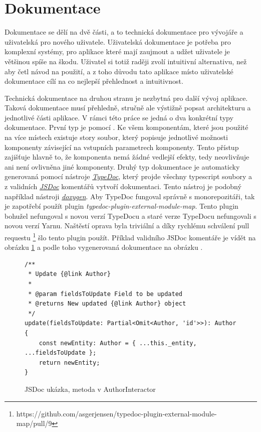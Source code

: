 \section{Dokumentace}
\label{sc:documentation}
Dokumentace se dělí na dvě části, a to technická dokumentace pro vývojáře a uživatelská pro nového uživatele. Uživatelská dokumentace je potřeba pro komplexní systémy, pro aplikace které mají zaujmout a udžet uživatele je většinou spíše na škodu. Uživatel si totiž raději zvolí intuitivní alternativu, než aby četl návod na použití, a z toho důvodu tato aplikace místo uživatelské dokumentace cílí na co nejlepší přehlednost a intuitivnost.

Technická dokumentace na druhou stranu je nezbytná pro další vývoj aplikace. Taková dokumentace musí přehledně, stručně ale výstižně popsat architekturu a jednotlivé části aplikace. V rámci této práce se jedná o dva konkrétní typy dokumentace. První typ je pomocí . Ke všem komponentám, které jsou použité na více místech existuje story soubor, který popisuje jednotlivé možnosti komponenty závisející na vstupních parametrech komponenty. Tento přístup zajišťuje hlavně to, že komponenta nemá žádné vedlejší efekty, tedy neovlivňuje ani není ovlivněna jiné komponenty. Druhý typ dokumentace je automaticky generovaná pomocí nástroje \href{https://typedoc.org/}{\emph{TypeDoc}}, který projde všechny typescript soubory a z validních \href{https://jsdoc.app/}{\emph{JSDoc}} komentářů vytvoří dokumentaci. Tento nástroj je podobný například nástroji \href{http://www.doxygen.nl/}{\emph{doxygen}}. Aby TypeDoc fungoval správně s monorepozitáři, tak je zapotřebí použít plugin \emph{typedoc-plugin-external-module-map}. Tento plugin bohužel nefungoval s novou verzí TypeDocu a staré verze TypeDocu nefungovali s novou verzí Yarnu. Naštěstí oprava byla triviální a díky rychlému schválení pull requestu \footnote{https://github.com/asgerjensen/typedoc-plugin-external-module-map/pull/9} šlo tento plugin použít. Příklad validního JSDoc komentáře je vídět na obrázku \ref{code:jsdoc} a podle toho vygenerovaná dokumentace na obrázku \cite{fig:documentation_example}.

\begin{figure}[h!]
    \centering
    \begin{verbatim}
/**
 * Update {@link Author}
 *
 * @param fieldsToUpdate Field to be updated
 * @returns New updated {@link Author} object
 */
update(fieldsToUpdate: Partial<Omit<Author, 'id'>>): Author {
    const newEntity: Author = { ...this._entity, ...fieldsToUpdate };
    return newEntity;
}
    \end{verbatim}
    \caption{JSDoc ukázka, metoda v AuthorInteractor}
    \label{code:jsdoc}
\end{figure}

